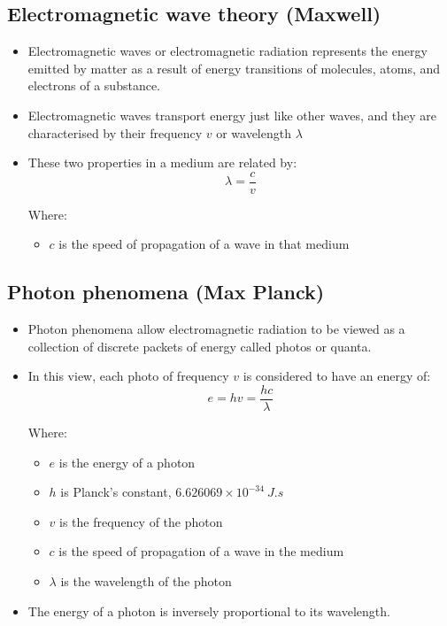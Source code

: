 \documentclass[11pt]{article}
\begin{document}
\subsection{Electromagnetic wave theory (Maxwell)}
\label{sec:org0950892}
\begin{itemize}
\item Electromagnetic waves or electromagnetic radiation represents the energy emitted by matter as a result of energy transitions of molecules, atoms, and electrons of a substance.
\item Electromagnetic waves transport energy just like other waves, and they are characterised by their frequency \(v\) or wavelength \(\lambda\)
\item These two properties in a medium are related by:
\[\lambda = \frac{c}{v}\]

Where:
\begin{itemize}
\item \(c\) is the speed of propagation of a wave in that medium
\end{itemize}
\end{itemize}

\subsection{Photon phenomena (Max Planck)}
\label{sec:orgc8e3288}
\begin{itemize}
\item Photon phenomena allow electromagnetic radiation to be viewed as a collection of discrete packets of energy called photos or quanta.
\item In this view, each photo of frequency \(v\) is considered to have an energy of:
\[e = hv = \frac{hc}{\lambda}\]

Where:
\begin{itemize}
\item \(e\) is the energy of a photon
\item \(h\) is Planck's constant, \(6.626069 \times 10^{-34} \ \unit{J.s}\)
\item \(v\) is the frequency of the photon
\item \(c\) is the speed of propagation of a wave in the medium
\item \(\lambda\) is the wavelength of the photon
\end{itemize}

\item The energy of a photon is inversely proportional to its wavelength.
\end{itemize}
\end{document}
